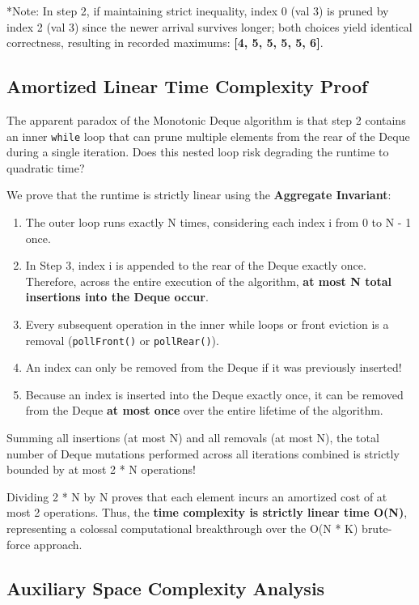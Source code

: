 \documentclass[10pt,journal,compsoc,onecolumn]{IEEEtran}
\begin{document}
*Note: In step 2, if maintaining strict inequality, index 0 (val 3) is pruned by index 2 (val 3) since the newer arrival survives longer; both choices yield identical correctness, resulting in recorded maximums: \textbf{[4, 5, 5, 5, 5, 6]}.

\subsection{Amortized Linear Time Complexity Proof}

The apparent paradox of the Monotonic Deque algorithm is that step 2 contains an inner \texttt{while} loop that can prune multiple elements from the rear of the Deque during a single iteration. Does this nested loop risk degrading the runtime to quadratic time?

We prove that the runtime is strictly linear using the \textbf{Aggregate Invariant}:
\begin{enumerate}
    \item The outer loop runs exactly N times, considering each index i from 0 to N - 1 once.
    \item In Step 3, index i is appended to the rear of the Deque exactly once. Therefore, across the entire execution of the algorithm, \textbf{at most N total insertions into the Deque occur}.
    \item Every subsequent operation in the inner while loops or front eviction is a removal (\texttt{pollFront()} or \texttt{pollRear()}).
    \item An index can only be removed from the Deque if it was previously inserted!
    \item Because an index is inserted into the Deque exactly once, it can be removed from the Deque \textbf{at most once} over the entire lifetime of the algorithm.
\end{enumerate}

Summing all insertions (at most N) and all removals (at most N), the total number of Deque mutations performed across all iterations combined is strictly bounded by at most 2 * N operations!

Dividing 2 * N by N proves that each element incurs an amortized cost of at most 2 operations. Thus, the \textbf{time complexity is strictly linear time O(N)}, representing a colossal computational breakthrough over the O(N * K) brute-force approach.

\subsection{Auxiliary Space Complexity Analysis}
\end{document}
